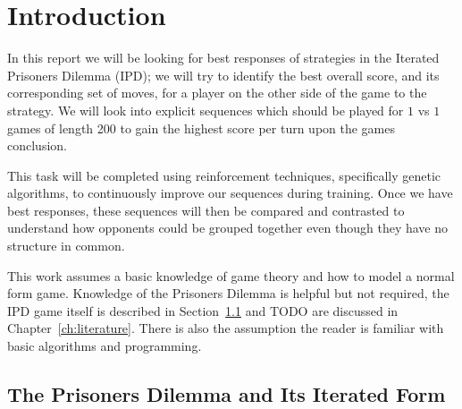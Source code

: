 
\chapter{Introduction}\label{ch:intro}
In this report we will be looking for best responses of strategies in the Iterated Prisoners Dilemma (IPD);
we will try to identify the best overall score, and its corresponding set of moves, for a player on the other side of the game to the strategy.
We will look into explicit sequences which should be played for $1$ vs $1$ games of length 200 to gain the highest score per turn upon the games conclusion.

This task will be completed using reinforcement techniques, specifically genetic algorithms, to continuously improve our sequences during training. Once we have best responses, these sequences will then be compared and contrasted to understand how opponents could be grouped together even though they have no structure in common.

This work assumes a basic knowledge of game theory and how to model a normal form game.
Knowledge of the Prisoners Dilemma is helpful but not required, the IPD game itself is described in Section~\ref{sec:iteratedPrisonersDilemma} and TODO are discussed in Chapter~\ref{ch:literature}.
There is also the assumption the reader is familiar with basic algorithms and programming.

\section{The Prisoners Dilemma and Its Iterated Form}\label{sec:iteratedPrisonersDilemma}

